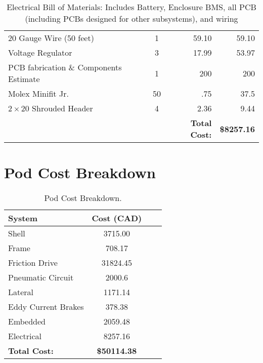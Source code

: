 \documentclass[main.tex]{subfiles}
\begin{document}
\begin{table}[H]
\begin{tabular}{@{}lcrr@{}}
        20 Gauge Wire (50 feet)& 1 & 59.10 & 59.10 \\
        Voltage Regulator& 3 & 17.99 & 53.97 \\
        PCB fabrication \& Components Estimate& 1 & 200 & 200 \\
        Molex Minifit Jr. & 50 & .75 & 37.5 \\
        $2\times 20$ Shrouded Header& 4 & 2.36 & 9.44 \\
        \midrule
        &  &  \textbf{Total Cost:} & \textbf{\$8257.16} \\ \bottomrule
      \end{tabular}
      \caption{Electrical Bill of Materials: Includes Battery, Enclosure BMS, all PCB (including PCBs designed for other subsystems), and wiring}
      \label{tab:electrical-bom}
\end{table}

\section{Pod Cost Breakdown}
\begin{table}[H]
  	  \centering
      \begin{tabular}{@{}lcrr@{}} \toprule
        System & Cost (CAD) \\ \midrule
        Shell & 3715.00 \\
        Frame & 708.17 \\
        Friction Drive & 31824.45 \\
        Pneumatic Circuit & 2000.6 \\
        Lateral & 1171.14 \\
        Eddy Current Brakes & 378.38 \\
        Embedded & 2059.48 \\
        Electrical & 8257.16 \\ \midrule
        \textbf{Total Cost:} & \textbf{\$50114.38} \\ \bottomrule
      \end{tabular}
      \caption{Pod Cost Breakdown.}
      \label{tab:pod-bom}
\end{table}
\end{document}
